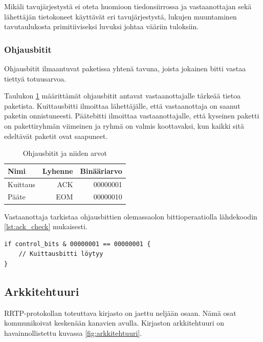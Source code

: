 \documentclass[a4paper,12pt]{article}
\begin{document}
    Mikäli tavujärjestystä ei oteta huomioon tiedonsiirrossa ja vastaanottajan sekä lähettäjän tietokoneet käyttävät eri tavujärjestystä, lukujen muuntaminen tavutaulukosta primitiiviseksi luvuksi johtaa vääriin tuloksiin.
    \cite{Adiga2007HowC}

    \subsubsection*{Ohjausbitit}\label{subsec:control_bits}
    Ohjausbitit ilmaantuvat paketissa yhtenä tavuna, joista jokainen bitti vastaa tiettyä totuusarvoa.

    Taulukon \ref{tab:control_bits} määrittämät ohjausbitit antavat vastaanottajalle tärkeää tietoa paketista. Kuittausbitti ilmoittaa lähettäjälle, että vastaanottaja on saanut paketin onnistuneesti. Päätebitti ilmoittaa vastaanottajalle, että kyseinen paketti on pakettiryhmän viimeinen ja ryhmä on valmis koottavaksi, kun kaikki sitä edeltävät paketit ovat saapuneet. \par
    
    \begin{table}[h!]
        \centering
        \begin{tabularx}{\textwidth}{|X|r|r|}
        \hline
            \textbf{Nimi}     & \textbf{Lyhenne} & \textbf{Binääriarvo} \\         \hline
            Kuittaus & ACK     & 00000001    \\ \hline
            Pääte    & EOM     & 00000010    \\ \hline
        \end{tabularx}
        \caption{Ohjausbitit ja niiden arvot}
        \label{tab:control_bits}
    \end{table}


    Vastaanottaja tarkistaa ohjausbittien olemassaolon bittioperaatiolla lähdekoodin \ref{lst:ack_check} mukaisesti.
    
    \begin{lstlisting}[float, caption={Kuittausbitin tarkistus ohjausbiteistä}, label={lst:ack_check}]
if control_bits & 00000001 == 00000001 {
    // Kuittausbitti löytyy
}\end{lstlisting}

    \subsection{Arkkitehtuuri}\label{sec:arkkitehtuuri}
    RRTP-protokollan toteuttava kirjasto on jaettu neljään osaan. Nämä osat kommunikoivat keskenään kanavien avulla. Kirjaston arkkitehtuuri on havainnollistettu kuvassa \ref{fig:arkkitehtuuri}. 
\end{document}
